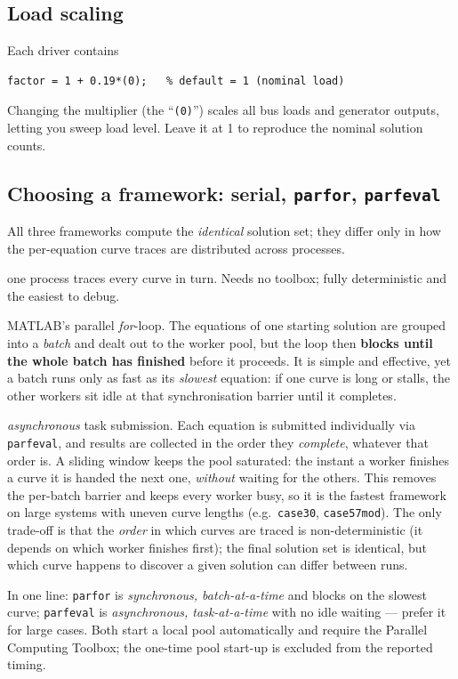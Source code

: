 \documentclass[11pt,a4paper]{article}
\newcommand{\code}[1]{\texttt{#1}}
\begin{document}
\subsection{Load scaling}
Each driver contains
\begin{lstlisting}[style=mat]
factor = 1 + 0.19*(0);   % default = 1 (nominal load)
\end{lstlisting}
Changing the multiplier (the ``\code{(0)}'') scales all bus loads and generator outputs,
letting you sweep load level. Leave it at 1 to reproduce the nominal solution counts.

\subsection{Choosing a framework: serial, \code{parfor}, \code{parfeval}}\label{sec:frameworks}
All three frameworks compute the \emph{identical} solution set; they differ only in how the
per-equation curve traces are distributed across processes.
\begin{description}[leftmargin=0em,style=nextline]
\item[Serial (\code{run_batch.m})] one process traces every curve in turn. Needs no
      toolbox; fully deterministic and the easiest to debug.
\item[\code{parfor} (\code{run_batch_par.m})] MATLAB's parallel \emph{for}-loop. The
      equations of one starting solution are grouped into a \emph{batch} and dealt out to
      the worker pool, but the loop then \textbf{blocks until the whole batch has
      finished} before it proceeds. It is simple and effective, yet a batch runs only as
      fast as its \emph{slowest} equation: if one curve is long or stalls, the other
      workers sit idle at that synchronisation barrier until it completes.
\item[\code{parfeval} (\code{run_batch_parfeval.m})] \emph{asynchronous} task submission.
      Each equation is submitted individually via \code{parfeval}, and results are
      collected in the order they \emph{complete}, whatever that order is. A sliding window
      keeps the pool saturated: the instant a worker finishes a curve it is handed the next
      one, \emph{without} waiting for the others. This removes the per-batch barrier and
      keeps every worker busy, so it is the fastest framework on large systems with uneven
      curve lengths (e.g.\ \code{case30}, \code{case57mod}). The only trade-off is that the
      \emph{order} in which curves are traced is non-deterministic (it depends on which
      worker finishes first); the final solution set is identical, but which curve happens
      to discover a given solution can differ between runs.
\end{description}
In one line: \code{parfor} is \emph{synchronous, batch-at-a-time} and blocks on the slowest
curve; \code{parfeval} is \emph{asynchronous, task-at-a-time} with no idle waiting ---
prefer it for large cases. Both start a local pool automatically and require the Parallel
Computing Toolbox; the one-time pool start-up is excluded from the reported timing.
\end{document}
